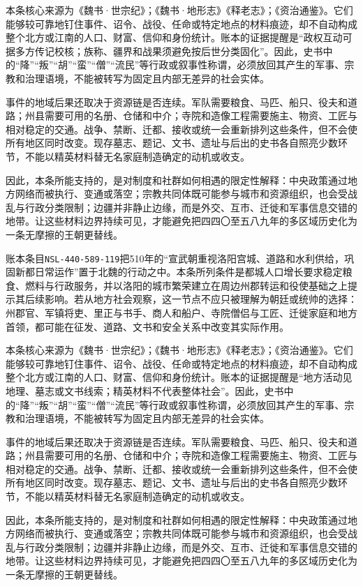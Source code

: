 本条核心来源为《魏书·世宗纪》；《魏书·地形志》《释老志》；《资治通鉴》。它们能够较可靠地钉住事件、诏令、战役、任命或特定地点的材料痕迹，却不自动构成整个北方或江南的人口、财富、信仰和身份统计。账本的证据提醒是“政权互动可据多方传记校核；族称、疆界和战果须避免按后世分类固化”。因此，史书中的“降”“叛”“胡”“蛮”“僧”“流民”等行政或叙事性称谓，必须放回其产生的军事、宗教和治理语境，不能被转写为固定且内部无差异的社会实体。

事件的地域后果还取决于资源链是否连续。军队需要粮食、马匹、船只、役夫和道路；州县需要可用的名册、仓储和中介；寺院和造像工程需要施主、物资、工匠与相对稳定的交通。战争、禁断、迁都、接收或统一会重新排列这些条件，但不会使所有地区同时改变。现存墓志、题记、文书、遗址与后出的史书各自照亮少数环节，不能以精英材料替无名家庭制造确定的动机或收支。

因此，本条所能支持的，是对制度和社群如何相遇的限定性解释：中央政策通过地方网络而被执行、变通或落空；宗教共同体既可能参与城市和资源组织，也会受战乱与行政分类限制；边疆并非静止边缘，而是外交、互市、迁徙和军事信息交错的地带。让这些材料边界持续可见，才能避免把四四〇至五八九年的多区域历史化为一条无摩擦的王朝更替线。

账本条目\texttt{NSL-440-589-119}把510年的“宣武朝重视洛阳宫城、道路和水利供给，巩固新都日常运作”置于北魏的行动之中。本条所列条件是都城人口增长要求稳定粮食、燃料与行政服务，并以洛阳的城市繁荣建立在周边州郡转运和役使基础之上提示其后续影响。若从地方社会观察，这一节点不应只被理解为朝廷或统帅的选择：州郡官、军镇将吏、里正与书手、商人和船户、寺院僧侣与工匠、迁徙家庭和地方首领，都可能在征发、道路、文书和安全关系中改变其实际作用。

本条核心来源为《魏书·世宗纪》；《魏书·地形志》《释老志》；《资治通鉴》。它们能够较可靠地钉住事件、诏令、战役、任命或特定地点的材料痕迹，却不自动构成整个北方或江南的人口、财富、信仰和身份统计。账本的证据提醒是“地方活动见地理、墓志或文书线索；精英材料不代表整体社会”。因此，史书中的“降”“叛”“胡”“蛮”“僧”“流民”等行政或叙事性称谓，必须放回其产生的军事、宗教和治理语境，不能被转写为固定且内部无差异的社会实体。

事件的地域后果还取决于资源链是否连续。军队需要粮食、马匹、船只、役夫和道路；州县需要可用的名册、仓储和中介；寺院和造像工程需要施主、物资、工匠与相对稳定的交通。战争、禁断、迁都、接收或统一会重新排列这些条件，但不会使所有地区同时改变。现存墓志、题记、文书、遗址与后出的史书各自照亮少数环节，不能以精英材料替无名家庭制造确定的动机或收支。

因此，本条所能支持的，是对制度和社群如何相遇的限定性解释：中央政策通过地方网络而被执行、变通或落空；宗教共同体既可能参与城市和资源组织，也会受战乱与行政分类限制；边疆并非静止边缘，而是外交、互市、迁徙和军事信息交错的地带。让这些材料边界持续可见，才能避免把四四〇至五八九年的多区域历史化为一条无摩擦的王朝更替线。

